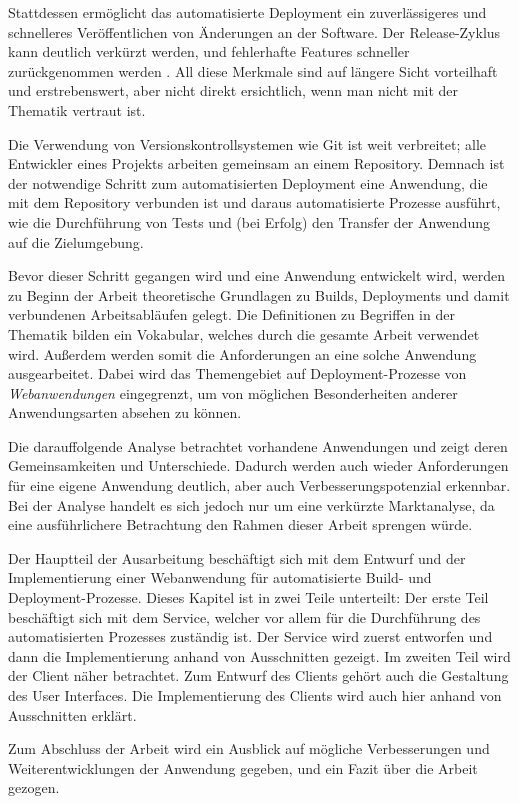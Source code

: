 Stattdessen ermöglicht das automatisierte Deployment ein zuverlässigeres und schnelleres Veröffentlichen von Änderungen an der Software. Der Release-Zyklus kann deutlich verkürzt werden, und fehlerhafte Features schneller zurückgenommen werden \citep[11f]{Humble2010}. All diese Merkmale sind auf längere Sicht vorteilhaft und erstrebenswert, aber nicht direkt ersichtlich, wenn man nicht mit der Thematik vertraut ist.

Die Verwendung von Versionskontrollsystemen wie Git ist weit verbreitet; alle Entwickler eines Projekts arbeiten gemeinsam an einem Repository. Demnach ist der notwendige Schritt zum automatisierten Deployment eine Anwendung, die mit dem Repository verbunden ist und daraus automatisierte Prozesse ausführt, wie die Durchführung von Tests und (bei Erfolg) den Transfer der Anwendung auf die Zielumgebung.

Bevor dieser Schritt gegangen wird und eine Anwendung entwickelt wird, werden zu Beginn der Arbeit  theoretische Grundlagen zu Builds, Deployments und damit verbundenen Arbeitsabläufen gelegt. Die Definitionen zu Begriffen in der Thematik bilden ein Vokabular, welches durch die gesamte Arbeit verwendet wird. Außerdem werden somit die Anforderungen an eine solche Anwendung ausgearbeitet. Dabei wird das Themengebiet auf Deployment-Prozesse von \emph{Webanwendungen} eingegrenzt, um von möglichen Besonderheiten anderer Anwendungsarten absehen zu können.

Die darauffolgende Analyse betrachtet vorhandene Anwendungen und zeigt deren Gemeinsamkeiten und Unterschiede. Dadurch werden auch wieder Anforderungen für eine eigene Anwendung deutlich, aber auch Verbesserungspotenzial erkennbar. Bei der Analyse handelt es sich jedoch nur um eine verkürzte Marktanalyse, da eine ausführlichere Betrachtung den Rahmen dieser Arbeit sprengen würde.

Der Hauptteil der Ausarbeitung beschäftigt sich mit dem Entwurf und der Implementierung einer Webanwendung für automatisierte Build- und De\-ploy\-ment-Prozesse. Dieses Kapitel ist in zwei Teile unterteilt: Der erste Teil beschäftigt sich mit dem Service, welcher vor allem für die Durchführung des automatisierten Prozesses zuständig ist. Der Service wird zuerst entworfen und dann die Implementierung anhand von Ausschnitten gezeigt. Im zweiten Teil wird der Client näher betrachtet. Zum Entwurf des Clients gehört auch die Gestaltung des User Interfaces. Die Implementierung des Clients wird auch hier anhand von Ausschnitten erklärt.

Zum Abschluss der Arbeit wird ein Ausblick auf mögliche Verbesserungen und Weiterentwicklungen der Anwendung gegeben, und ein Fazit über die Arbeit gezogen.
